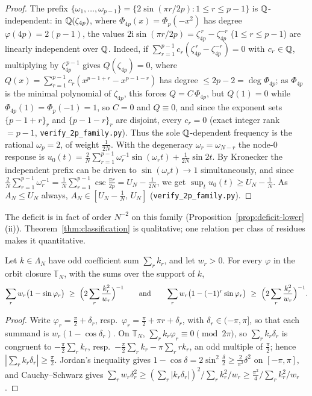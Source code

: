 \begin{proof}
The prefix $\{\omega_1,\dots,\omega_{p-1}\}=\{2\sin(\pi r/2p):1\le r\le p-1\}$ is $\mathbb{Q}$-independent: in
$\mathbb{Q}(\zeta_{4p})$, where $\Phi_{4p}(x)=\Phi_p(-x^2)$ has degree $\varphi(4p)=2(p-1)$, the values
$2\mathrm i\sin(\pi r/2p)=\zeta_{4p}^{\,r}-\zeta_{4p}^{-r}$ ($1\le r\le p-1$) are linearly independent over
$\mathbb{Q}$. Indeed, if $\sum_{r=1}^{p-1}c_r(\zeta_{4p}^{\,r}-\zeta_{4p}^{-r})=0$ with $c_r\in\mathbb{Q}$, multiplying by
$\zeta_{4p}^{\,p-1}$ gives $Q(\zeta_{4p})=0$, where $Q(x)=\sum_{r=1}^{p-1}c_r(x^{p-1+r}-x^{p-1-r})$ has
degree $\le2p-2=\deg\Phi_{4p}$; as $\Phi_{4p}$ is the minimal polynomial of $\zeta_{4p}$, this forces
$Q=C\,\Phi_{4p}$, but $Q(1)=0$ while $\Phi_{4p}(1)=\Phi_p(-1)=1$, so $C=0$ and $Q\equiv0$, and since the
exponent sets $\{p-1+r\}_r$ and $\{p-1-r\}_r$ are disjoint, every $c_r=0$ (exact integer rank $=p-1$,
\texttt{verify\_2p\_family.py}). Thus the sole $\mathbb{Q}$-dependent frequency is the rational $\omega_p=2$, of
weight $\tfrac1{2N}$. With the degeneracy
$\omega_r=\omega_{N-r}$ the node-$0$ response is
$u_0(t)=\tfrac2N\sum_{r=1}^{p-1}\omega_r^{-1}\sin(\omega_r t)+\tfrac1{2N}\sin 2t$. By Kronecker the
independent prefix can be driven to $\sin(\omega_r t)\to1$ simultaneously, and since
$\tfrac2N\sum_{r=1}^{p-1}\omega_r^{-1}=\tfrac1N\sum_{r=1}^{p-1}\csc\tfrac{\pi r}{2p}=U_N-\tfrac1{2N}$,
we get $\sup_t u_0(t)\ge U_N-\tfrac1N$. As $A_N\le U_N$ always, $A_N\in[U_N-\tfrac1N,\,U_N]$
(\texttt{verify\_2p\_family.py}).
\end{proof}

\noindent The deficit is in fact of order $N^{-2}$ on this family (Proposition~\ref{prop:deficit-lower}(ii)).
Theorem~\ref{thm:classification} is qualitative; one relation per class of residues makes it quantitative.

\begin{lemma}\label{lem:rel-defect}
Let $k\in\Lambda_N$ have odd coefficient sum $\sum_rk_r$, and let $w_r>0$. For every $\varphi$ in the orbit
closure $\mathbb T_N$, with the sums over the support of $k$,
\[
  \sum_rw_r\bigl(1-\sin\varphi_r\bigr)\ \ge\ \Bigl(2\sum_r\frac{k_r^2}{w_r}\Bigr)^{-1}
  \qquad\text{and}\qquad
  \sum_rw_r\bigl(1-(-1)^r\sin\varphi_r\bigr)\ \ge\ \Bigl(2\sum_r\frac{k_r^2}{w_r}\Bigr)^{-1}.
\]
\end{lemma}

\begin{proof}
Write $\varphi_r=\tfrac\pi2+\delta_r$, resp.\ $\varphi_r=\tfrac\pi2+\pi r+\delta_r$, with $\delta_r\in(-\pi,\pi]$,
so that each summand is $w_r(1-\cos\delta_r)$. On $\mathbb T_N$, $\sum_rk_r\varphi_r\equiv0\pmod{2\pi}$, so
$\sum_rk_r\delta_r$ is congruent to $-\tfrac\pi2\sum_rk_r$, resp.\ $-\tfrac\pi2\sum_rk_r-\pi\sum_rrk_r$, an odd
multiple of $\tfrac\pi2$; hence $|\sum_rk_r\delta_r|\ge\tfrac\pi2$. Jordan's inequality gives
$1-\cos\delta=2\sin^2\tfrac\delta2\ge\tfrac2{\pi^2}\delta^2$ on $[-\pi,\pi]$, and Cauchy--Schwarz gives
$\sum_rw_r\delta_r^2\ge(\sum_r|k_r\delta_r|)^2/\sum_rk_r^2/w_r\ge\tfrac{\pi^2}4/\sum_rk_r^2/w_r$.
\end{proof}

